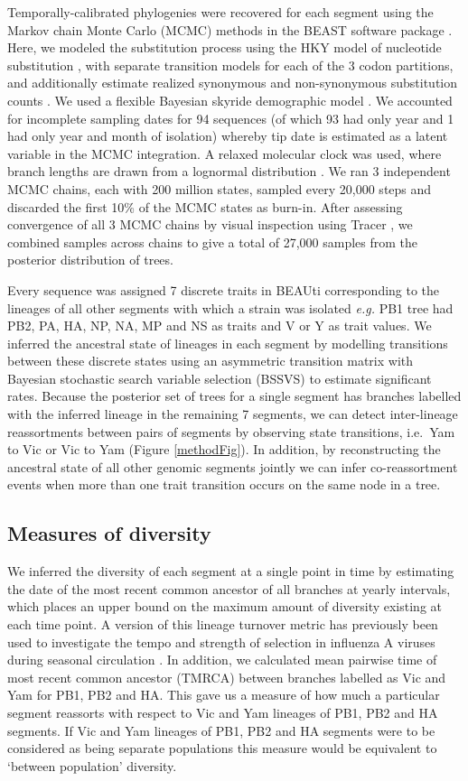 \documentclass[11pt,oneside,letterpaper]{article}
\begin{document}
Temporally-calibrated phylogenies were recovered for each segment using the Markov chain Monte Carlo (MCMC) methods in the BEAST software package \cite{drummond2012}.
Here, we modeled the substitution process using the HKY model of nucleotide substitution \cite{hky1985}, with separate transition models for each of the 3 codon partitions, and additionally estimate realized synonymous and non-synonymous substitution counts \cite{obrien2009}.
We used a flexible Bayesian skyride demographic model \cite{minin2008}.
We accounted for incomplete sampling dates for 94 sequences (of which 93 had only year and 1 had only year and month of isolation) whereby tip date is estimated as a latent variable in the MCMC integration.
A relaxed molecular clock was used, where branch lengths are drawn from a lognormal distribution \cite{drummond2006}.
We ran 3 independent MCMC chains, each with 200 million states, sampled every 20,000 steps and discarded the first 10\% of the MCMC states as burn-in.
After assessing convergence of all 3 MCMC chains by visual inspection using Tracer \cite{tracer}, we combined samples across chains to give a total of 27,000 samples from the posterior distribution of trees.

Every sequence was assigned 7 discrete traits in BEAUti corresponding to the lineages of all other segments with which a strain was isolated \textit{e.g.} PB1 tree had PB2, PA, HA, NP, NA, MP and NS as traits and V or Y as trait values.
We inferred the ancestral state of lineages in each segment by modelling transitions between these discrete states using an asymmetric transition matrix \cite{lemey2009} with Bayesian stochastic search variable selection (BSSVS) to estimate significant rates.
Because the posterior set of trees for a single segment has branches labelled with the inferred lineage in the remaining 7 segments, we can detect inter-lineage reassortments between pairs of segments by observing state transitions, i.e.\ Yam to Vic or Vic to Yam (Figure \ref{methodFig}).
In addition, by reconstructing the ancestral state of all other genomic segments jointly we can infer co-reassortment events when more than one trait transition occurs on the same node in a tree.

\subsection*{Measures of diversity}
We inferred the diversity of each segment at a single point in time by estimating the date of the most recent common ancestor of all branches at yearly intervals, which places an upper bound on the maximum amount of diversity existing at each time point.
A version of this lineage turnover metric has previously been used to investigate the tempo and strength of selection in influenza A viruses during seasonal circulation \cite{bedford2011}.
In addition, we calculated mean pairwise time of most recent common ancestor (TMRCA) between branches labelled as Vic and Yam for PB1, PB2 and HA.
This gave us a measure of how much a particular segment reassorts with respect to Vic and Yam lineages of PB1, PB2 and HA segments.
If Vic and Yam lineages of PB1, PB2 and HA segments were to be considered as being separate populations this measure would be equivalent to `between population' diversity.
\end{document}

